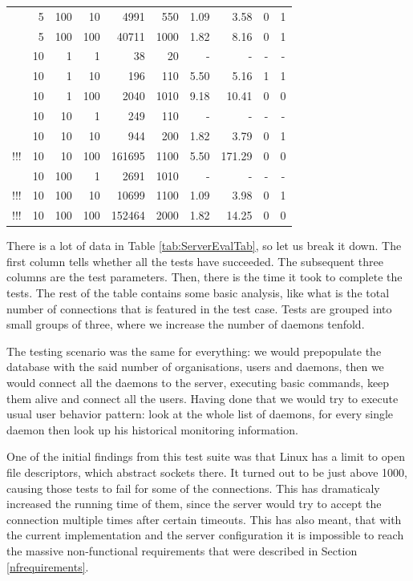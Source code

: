 \documentclass{l3proj}
\begin{document}
\begin{table}
\begin{center}
\begin{tabular}{ | c | r | r | r || r || r | r | r | c | c | }
      & 5 & 100 & 10 & 4991 & 550 & 1.09 & 3.58 & 0 & 1 \\  
      \rowcolor{Grey}
      & 5 & 100 & 100 & 40711 & 1000 & 1.82 & 8.16 & 0 & 1 \\  
      & 10 & 1 & 1 & 38 & 20 & - & - & - & - \\  
      \rowcolor{Grey}
      & 10 & 1 & 10 & 196 & 110 & 5.50 & 5.16 & 1 & 1 \\  
      & 10 & 1 & 100 & 2040 & 1010 & 9.18 & 10.41 & 0 & 0 \\  
      \rowcolor{Grey}
      & 10 & 10 & 1 & 249 & 110 & - & - & - & - \\  
      & 10 & 10 & 10 & 944 & 200 & 1.82 & 3.79 & 0 & 1 \\  
      \rowcolor{Grey}
     !!! & 10 & 10 & 100 & 161695 & 1100 & 5.50 & 171.29 & 0 & 0 \\
      & 10 & 100 & 1 & 2691 & 1010 & - & - & - & - \\  
      \rowcolor{Grey}
     !!! & 10 & 100 & 10 & 10699 & 1100 & 1.09 & 3.98 & 0 & 1 \\  
     !!! & 10 & 100 & 100 & 152464 & 2000 & 1.82 & 14.25 & 0 & 0 \\
    \hline
  \end{tabular}
\end{center}
\end{table}

There is a lot of data in Table \ref{tab:ServerEvalTab}, so let us break it down. The first column tells whether all the tests have succeeded. The subsequent three columns are the test parameters. Then, there is the time it took to complete the tests. The rest of the table contains some basic analysis, like what is the total number of connections that is featured in the test case. Tests are grouped into small groups of three, where we increase the number of daemons tenfold. 

The testing scenario was the same for everything: we would prepopulate the database with the said number of organisations, users and daemons, then we would connect all the daemons to the server, executing basic commands, keep them alive and connect all the users. Having done that we would try to execute usual user behavior pattern: look at the whole list of daemons, for every single daemon then look up his historical monitoring information.

One of the initial findings from this test suite was that Linux has a limit to open file descriptors, which abstract sockets there. It turned out to be just above 1000, causing those tests to fail for some of the connections. This has dramaticaly increased the running time of them, since the server would try to accept the connection multiple times after certain timeouts. This has also meant, that with the current implementation and the server configuration it is impossible to reach the massive non-functional requirements that were described in Section \ref{nfrequirements}.
\end{document}
